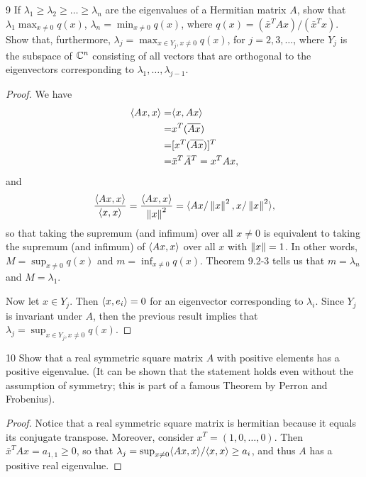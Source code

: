 \begin{exercise}{9}
If $\lambda_1 \geq \lambda_2 \geq \dots \geq \lambda_n$ are the eigenvalues of a Hermitian matrix $A$, show that $\lambda_1 \max_{x \neq 0} q(x)$, $\lambda_n = \min_{x \neq 0} q(x)$, where $q(x) = (\bar{x}^T A x) / (\bar{x}^T x)$.
Show that, furthermore, $\lambda_j = \max_{x \in Y_j, x \neq 0} q(x)$, for $j = 2, 3, \dots$, where $Y_j$ is the subspace of $\mathbb{C}^n$ consisting of all vectors that are orthogonal to the eigenvectors corresponding to $\lambda_1, \dots, \lambda_{j-1}$.
\end{exercise}
\begin{proof}
We have 
\begin{align*}
    \langle Ax, x\rangle 
    =& \langle x, Ax\rangle\\
    =& x^T (\overline{Ax})\\ 
    =& [x^T (\overline{A x})]^T \\
    =& \bar{x}^T \bar{A}^T
    = x^T A x,
\end{align*}
and
\begin{align*}
    \frac{\langle Ax, x\rangle}{\langle x, x\rangle}
    = \frac{\langle Ax, x\rangle}{\left\lVert x\right\rVert^2}
    = \langle Ax / \left\lVert x\right\rVert^2, x / \left\lVert x\right\rVert^2\rangle,
\end{align*}
so that taking the supremum (and infimum) over all $x \neq 0$ is equivalent to taking the supremum (and infimum) of $\langle Ax, x\rangle$ over all $x$ with $\left\lVert x\right\rVert = 1$.
In other words, $M = \sup_{x \neq 0} q(x)$ and $m = \inf_{x \neq 0} q(x)$.
Theorem 9.2-3 tells us that $m = \lambda_n$ and $M = \lambda_1$.

Now let $x \in Y_j$.
Then $\langle x, e_i\rangle = 0$ for an eigenvector corresponding to $\lambda_i$.
Since $Y_j$ is invariant under $A$, then the previous result implies that $\lambda_j = \sup_{x \in Y_j, x \neq 0} q(x)$.
\end{proof} 

\begin{exercise}{10}
Show that a real symmetric square matrix $A$ with positive elements has a positive eigenvalue.
(It can be shown that the statement holds even without the assumption of symmetry;
this is part of a famous Theorem by Perron and Frobenius).
\end{exercise}
\begin{proof}
Notice that a real symmetric square matrix is hermitian because it equals its conjugate transpose.
Moreover, consider $x^T = (1, 0, \dots, 0)$.
Then $\bar{x}^T A x =  a_{1, 1} \geq 0$, so that $\lambda_j = \sup_{x \neq 0} \langle Ax, x\rangle / \langle x, x\rangle \geq a_i$, and thus $A$ has a positive real eigenvalue.
\end{proof} 

